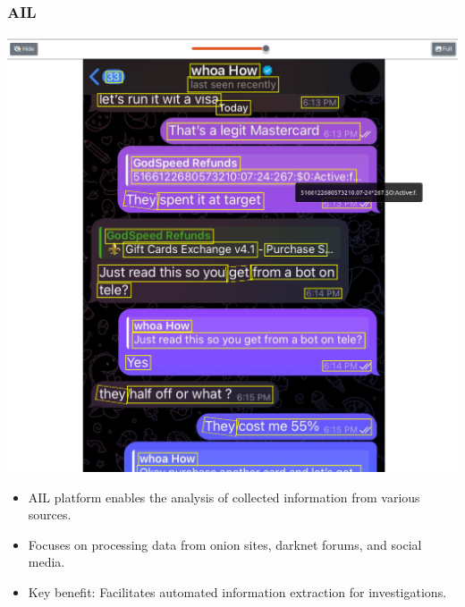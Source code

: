 \begin{frame}
    \frametitle{AIL}
    \begin{minipage}{0.45\textwidth} %
        \includegraphics[scale=0.15]{img/ail1.png}
    \end{minipage}%
    \hfill
    \begin{minipage}{0.5\textwidth} %
        \begin{itemize}
            \item AIL platform enables the analysis of collected information from various sources.
            \item Focuses on processing data from onion sites, darknet forums, and social media.
            \item Key benefit: Facilitates automated information extraction for investigations.
        \end{itemize}
    \end{minipage}
\end{frame}


